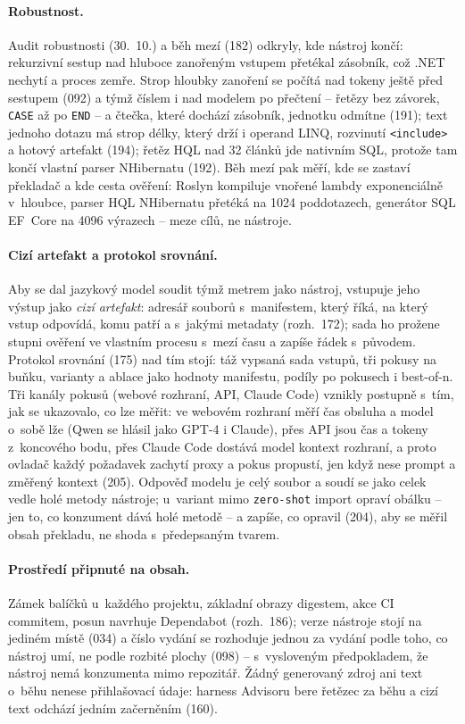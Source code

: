 \documentclass{article}
\begin{document}
\paragraph{Robustnost.} Audit robustnosti (30.~10.) a běh mezí (182) odkryly, kde nástroj končí: rekurzivní sestup nad hluboce zanořeným vstupem přetékal zásobník, což .NET nechytí a proces zemře. Strop hloubky zanoření se počítá nad tokeny ještě před sestupem (092) a týmž číslem i nad modelem po přečtení -- řetězy bez závorek, \texttt{CASE} až po \texttt{END} -- a čtečka, které dochází zásobník, jednotku odmítne (191); text jednoho dotazu má strop délky, který drží i operand LINQ, rozvinutí \texttt{<include>} a hotový artefakt (194); řetěz HQL nad 32 článků jde nativním SQL, protože tam končí vlastní parser NHibernatu (192). Běh mezí pak měří, kde se zastaví překladač a kde cesta ověření: Roslyn kompiluje vnořené lambdy exponenciálně v~hloubce, parser HQL NHibernatu přetéká na 1024 poddotazech, generátor SQL EF~Core na 4096 výrazech -- meze cílů, ne nástroje.

\paragraph{Cizí artefakt a protokol srovnání.} Aby se dal jazykový model soudit týmž metrem jako nástroj, vstupuje jeho výstup jako \emph{cizí artefakt}: adresář souborů s~manifestem, který říká, na který vstup odpovídá, komu patří a s~jakými metadaty (rozh.~172); sada ho prožene stupni ověření ve vlastním procesu s~mezí času a zapíše řádek s~původem. Protokol srovnání (175) nad tím stojí: táž vypsaná sada vstupů, tři pokusy na buňku, varianty a ablace jako hodnoty manifestu, podíly po pokusech i best-of-n. Tři kanály pokusů (webové rozhraní, API, Claude Code) vznikly postupně s~tím, jak se ukazovalo, co lze měřit: ve webovém rozhraní měří čas obsluha a model o~sobě lže (Qwen se hlásil jako GPT-4 i Claude), přes API jsou čas a tokeny z~koncového bodu, přes Claude Code dostává model kontext rozhraní, a proto ovladač každý požadavek zachytí proxy a pokus propustí, jen když nese prompt a změřený kontext (205). Odpověď modelu je celý soubor a soudí se jako celek vedle holé metody nástroje; u~variant mimo \texttt{zero-shot} import opraví obálku -- jen to, co konzument dává holé metodě -- a zapíše, co opravil (204), aby se měřil obsah překladu, ne shoda s~předepsaným tvarem.

\paragraph{Prostředí připnuté na obsah.} Zámek balíčků u~každého projektu, základní obrazy digestem, akce CI commitem, posun navrhuje Dependabot (rozh.~186); verze nástroje stojí na jediném místě (034) a číslo vydání se rozhoduje jednou za vydání podle toho, co nástroj umí, ne podle rozbité plochy (098) -- s~vysloveným předpokladem, že nástroj nemá konzumenta mimo repozitář. Žádný generovaný zdroj ani text o~běhu nenese přihlašovací údaje: harness Advisoru bere řetězec za běhu a cizí text odchází jedním začerněním (160).
\end{document}
